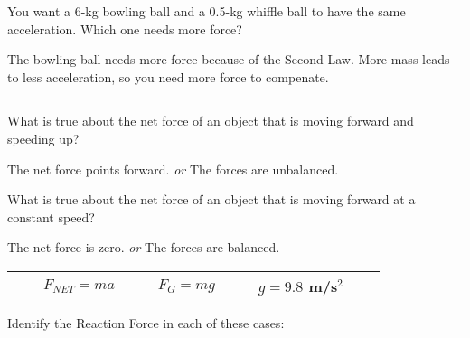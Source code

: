 \documentclass[10pt]{exam}
\newcommand{\printeqs}{
  \ifprintanswers
  \else
    \begin{center}
      \begin{tabular}{|*{11}{c}|}
        \hline 
        && $F_{NET} = ma$ & & & $F_G =mg$ & & & $g=9.8$ m/s$^2$ &&\\
        \hline
      \end{tabular}
    \end{center}
  \fi
}
\newcommand{\mypagebreak}{
  \ifprintanswers
  \else
    \pagebreak
  \fi
}
\begin{document}
\begin{questions}
    \question
    You want a 6-kg bowling ball and a 0.5-kg whiffle ball to have the same acceleration.  Which one needs more force?

    \begin{solution}[\stretch{2}]
      The bowling ball needs more force because of the Second Law.  More mass leads to less acceleration, so you need more force to compenate.
    \end{solution}

  \hrule

  \question
    What is true about the net force of an object that is moving forward and speeding up?

    \begin{solution}[\stretch{2}]
      The net force points forward. \emph{or} The forces are unbalanced.
    \end{solution}

  \question
    What is true about the net force of an object that is moving forward at a constant speed?

    \begin{solution}[\stretch{1}]
      The net force is zero. \emph{or} The forces are balanced.
    \end{solution}


  \mypagebreak
  \printeqs

  \question
    Identify the Reaction Force in each of these cases:

\end{questions}
\end{document}
